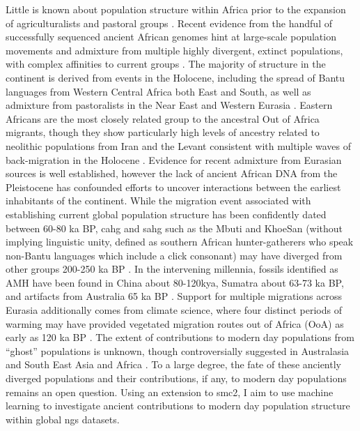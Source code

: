 Little is known about population structure within Africa prior to the expansion of agriculturalists and pastoral groups \cite{Busby2016, Patin2017}. Recent evidence from the handful of successfully sequenced ancient African genomes hint at large-scale population movements and admixture from multiple highly divergent, extinct populations, with complex affinities to current groups \cite{Skoglund2018, Lipson2019, GallegoLlorente2015a}. The majority of structure in the continent is derived from events in the Holocene, including the spread of Bantu languages from Western Central Africa both East and South, as well as admixture from pastoralists in the Near East and Western Eurasia \cite{Busby2016}. Eastern Africans are the most closely related group to the ancestral Out of Africa migrants, though they show particularly high levels of ancestry related to neolithic populations from Iran and the Levant consistent with multiple waves of back-migration in the Holocene \cite{Skoglund2017}.  
Evidence for recent admixture from Eurasian sources is well established, however the lack of ancient African DNA from the Pleistocene has confounded efforts to uncover interactions between the earliest inhabitants of the continent.
While the migration event associated with establishing current global population structure has been confidently dated between 60-80 ka BP, \gls{cahg} and \gls{sahg} such as the Mbuti and KhoeSan (without implying linguistic unity, defined as southern African hunter-gatherers who speak non-Bantu languages which include a click consonant) may have diverged from other groups 200-250 ka BP \cite{Lipson2019, Schlebusch2017}. 
In the intervening millennia, fossils identified as AMH have been found in China about 80-120kya, Sumatra about 63-73 ka BP, and artifacts from Australia 65 ka BP \cite{Clarkson2017, Liu2015, Westaway2017}.
Support for multiple migrations across Eurasia additionally comes from climate science, where four distinct periods of warming may have provided vegetated migration routes out of Africa (OoA) as early as 120 ka BP \cite{Timmermann2016}.
The extent of contributions to modern day populations from ``ghost'' populations is unknown, though controversially suggested in Australasia and South East Asia \cite{Malaspinas2016, Mallick2016, Pagani2016, Rasmussen2011, Skoglund2015} and Africa  \cite{Durvasula2019, Speidel2019, Lipson2019, Hammer2011, Plagnol2006, Ragsdale2019}.
To a large degree, the fate of these anciently diverged populations and their contributions, if any, to modern day populations remains an open question. 
Using an extension to \gls{smc2}, I aim to use machine learning to investigate ancient contributions to modern day population structure within global \gls{ngs} datasets.



